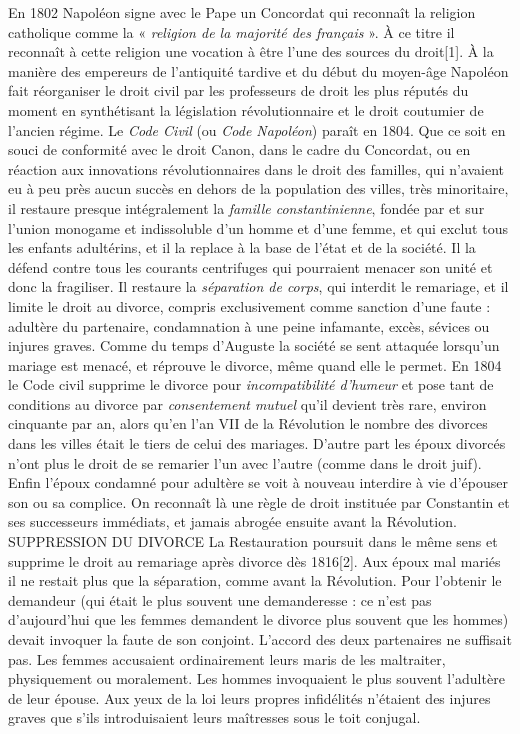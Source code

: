 

 En 1802 Napoléon signe avec le Pape un Concordat qui reconnaît la religion catholique comme la « \emph{religion de la majorité des français} ». À ce titre il reconnaît à cette religion une vocation à être l'une des sources du droit[1]. À la manière des empereurs de l'antiquité tardive et du début du moyen-âge Napoléon fait réorganiser le droit civil par les professeurs de droit les plus réputés du moment en synthétisant la législation révolutionnaire et le droit coutumier de l'ancien régime. 
 Le \emph{Code Civil} (ou \emph{Code Napoléon}) paraît en 1804. Que ce soit en souci de conformité avec le droit Canon, dans le cadre du Concordat, ou en réaction aux innovations révolutionnaires dans le droit des familles, qui n'avaient eu à peu près aucun succès en dehors de la population des villes, très minoritaire, il restaure presque intégralement la \emph{famille constantinienne}, fondée par et sur l'union monogame et indissoluble d'un homme et d'une femme, et qui exclut tous les enfants adultérins, et il la replace à la base de l'état et de la société. Il la défend contre tous les courants centrifuges qui pourraient menacer son unité et donc la fragiliser. Il restaure la \emph{séparation de corps}, qui interdit le remariage, et il limite le droit au divorce, compris exclusivement comme sanction d'une faute : adultère du partenaire, condamnation à une peine infamante, excès, sévices ou injures graves. 
 Comme du temps d'Auguste la société se sent attaquée lorsqu'un mariage est menacé, et réprouve le divorce, même quand elle le permet. En 1804 le Code civil supprime le divorce pour \emph{incompatibilité d'humeur} et pose tant de conditions au divorce par \emph{consentement mutuel} qu'il devient très rare, environ cinquante par an, alors qu'en l'an VII de la Révolution le nombre des divorces dans les villes était le tiers de celui des mariages. D'autre part les époux divorcés n'ont plus le droit de se remarier l'un avec l'autre (comme dans le droit juif). Enfin l'époux condamné pour adultère se voit à nouveau interdire à vie d'épouser son ou sa complice. On reconnaît là une règle de droit instituée par Constantin et ses successeurs immédiats, et jamais abrogée ensuite avant la Révolution.
SUPPRESSION DU DIVORCE
 La Restauration poursuit dans le même sens et supprime le droit au remariage après divorce dès 1816[2]. Aux époux mal mariés il ne restait plus que la séparation, comme avant la Révolution. Pour l'obtenir le demandeur (qui était le plus souvent une demanderesse : ce n'est pas d'aujourd'hui que les femmes demandent le divorce plus souvent que les hommes) devait invoquer la faute de son conjoint. L'accord des deux partenaires ne suffisait pas. Les femmes accusaient ordinairement leurs maris de les maltraiter, physiquement ou moralement. Les hommes invoquaient le plus souvent l'adultère de leur épouse. Aux yeux de la loi leurs propres infidélités n'étaient des injures graves que s'ils introduisaient leurs maîtresses sous le toit conjugal. 
